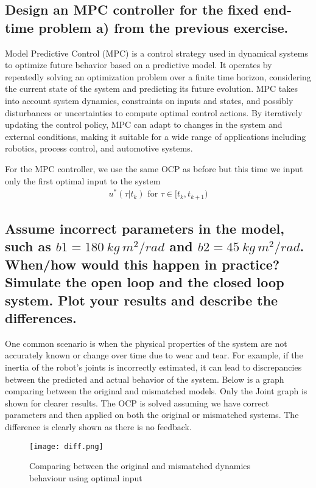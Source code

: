 \documentclass[a4paper, 12pt]{report}
\begin{document}
\subsection{Design an MPC controller for the fixed end-time problem a) from the previous exercise.}
Model Predictive Control (MPC) is a control strategy used in dynamical systems to optimize future behavior based on a predictive model. It operates by repeatedly solving an optimization problem over a finite time horizon, considering the current state of the system and predicting its future evolution. MPC takes into account system dynamics, constraints on inputs and states, and possibly disturbances or uncertainties to compute optimal control actions. By iteratively updating the control policy, MPC can adapt to changes in the system and external conditions, making it suitable for a wide range of applications including robotics, process control, and automotive systems.

For the MPC controller, we use the same OCP as before but this time we input only the first optimal input to the system
\begin{align*}
u^*(\tau|t_k) \text{  for  } \tau \in [t_k, t_{k+1})
\end{align*}


\subsection{Assume incorrect parameters in the model, such as $b1 = 180\ kg\ m^2/rad$ and $b2 = 45 \ kg\ m^2/rad$.
When/how would this happen in practice? Simulate the open loop and the closed loop system. Plot
your results and describe the differences.}
One common scenario is when the physical properties of the system are not accurately known or change over time due to wear and tear. For example, if the inertia of the robot's joints is incorrectly estimated, it can lead to discrepancies between the predicted and actual behavior of the system.
Below is a graph comparing between the original and mismatched models. Only the Joint graph is shown for clearer results. The OCP is solved assuming we have correct parameters and then applied on both the original or mismatched systems. The difference is clearly shown as there is no feedback.

\begin{figure}[H]
    \centering
    \texttt{[image: diff.png]}
    \caption{Comparing between the original and mismatched dynamics behaviour using optimal input}
    \label{fig:enter-label}
\end{figure}
\end{document}
